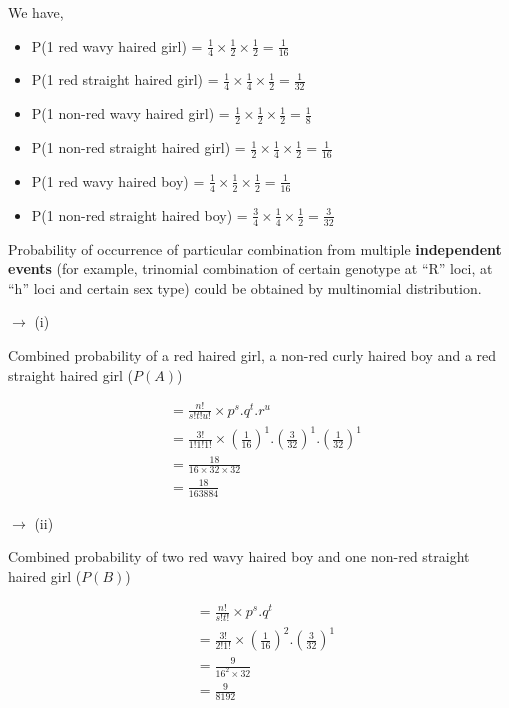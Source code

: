\documentclass[
  answers,addpoints,12pt]{exam}
\providecommand{\tightlist}{%
  \setlength{\itemsep}{0pt}\setlength{\parskip}{0pt}}
\begin{document}
We have,

\begin{itemize}
\tightlist
\item
  P(1 red wavy haired girl) = \(\frac{1}{4}\times \frac{1}{2} \times \frac{1}{2} = \frac{1}{16}\)
\item
  P(1 red straight haired girl) = \(\frac{1}{4}\times \frac{1}{4} \times \frac{1}{2} = \frac{1}{32}\)
\item
  P(1 non-red wavy haired girl) = \(\frac{1}{2}\times \frac{1}{2} \times \frac{1}{2} = \frac{1}{8}\)
\item
  P(1 non-red straight haired girl) = \(\frac{1}{2}\times \frac{1}{4} \times \frac{1}{2} = \frac{1}{16}\)
\item
  P(1 red wavy haired boy) = \(\frac{1}{4}\times \frac{1}{2} \times \frac{1}{2} = \frac{1}{16}\)
\item
  P(1 non-red straight haired boy) = \(\frac{3}{4}\times \frac{1}{4} \times \frac{1}{2} = \frac{3}{32}\)
\end{itemize}

Probability of occurrence of particular combination from multiple \textbf{independent events} (for example, trinomial combination of certain genotype at ``R'' loci, at ``h'' loci and certain sex type) could be obtained by multinomial distribution.

\(\longrightarrow\) (i)

Combined probability of a red haired girl, a non-red curly haired boy and a red straight haired girl (\(P(A)\))

\[
\begin{aligned}
&= \frac{n!}{s!t!u!} \times p^s.q^t.r^u \\
&= \frac{3!}{1!1!1!} \times \left(\frac{1}{16}\right)^1.\left(\frac{3}{32}\right)^1.\left(\frac{1}{32}\right)^1 \\
&= \frac{18}{16\times 32 \times 32} \\
&= \frac{18}{163884}
\end{aligned}
\]

\(\longrightarrow\) (ii)

Combined probability of two red wavy haired boy and one non-red straight haired girl (\(P(B)\))

\[
\begin{aligned}
&= \frac{n!}{s!t!} \times p^s.q^t \\
&= \frac{3!}{2!1!} \times \left(\frac{1}{16}\right)^2.\left(\frac{3}{32}\right)^1 \\
&= \frac{9}{16^2\times 32} \\
&= \frac{9}{8192}
\end{aligned}
\]
\end{document}
